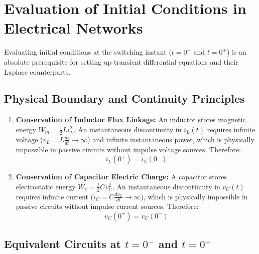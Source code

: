 \documentclass[12pt,a4paper]{article}
\begin{document}
\section{Evaluation of Initial Conditions in Electrical Networks}

Evaluating initial conditions at the switching instant ($t = 0^-$ and $t = 0^+$) is an absolute prerequisite for setting up transient differential equations and their Laplace counterparts.

\subsection{Physical Boundary and Continuity Principles}

\begin{tcolorbox}[defbox, title={\textbf{Energy Continuity Postulates}}]
\begin{enumerate}[leftmargin=*]
  \item \textbf{Conservation of Inductor Flux Linkage:} An inductor stores magnetic energy $W_m = \frac{1}{2} L i_L^2$. An instantaneous discontinuity in $i_L(t)$ requires infinite voltage ($v_L = L \frac{di}{dt} \to \infty$) and infinite instantaneous power, which is physically impossible in passive circuits without impulse voltage sources. Therefore:
  \begin{equation}
    i_L(0^+) = i_L(0^-)
  \end{equation}
  \item \textbf{Conservation of Capacitor Electric Charge:} A capacitor stores electrostatic energy $W_e = \frac{1}{2} C v_C^2$. An instantaneous discontinuity in $v_C(t)$ requires infinite current ($i_C = C \frac{dv_C}{dt} \to \infty$), which is physically impossible in passive circuits without impulse current sources. Therefore:
  \begin{equation}
    v_C(0^+) = v_C(0^-)
  \end{equation}
\end{enumerate}
\end{tcolorbox}

\subsection{Equivalent Circuits at $t=0^-$ and $t=0^+$}
\end{document}

